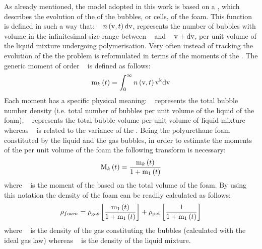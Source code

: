 \newcommand{ \YingYang}{ \ensuremath{\NumberDensityFunction{\BubbleVolume,\Time} \mathrm{d} \BubbleVolume}}
\newcommand{ \SangYang}{ \ensuremath{ \BubbleVolume + \mathrm{d} \BubbleVolume}}
As already mentioned, the model adopted in this work is based on a {\PopulationBalanceEquation}, which describes the evolution of the {\BubbleSizeDistribution} of the bubbles, or cells, of the foam. This function is defined in such a way that: {~\YingYang}, represents the number of bubbles with volume in the infinitesimal size range between {~\BubbleVolume} and {~\SangYang}, per unit volume of the liquid mixture undergoing polymerisation. 
Very often instead of tracking the evolution of the {\BubbleSizeDistribution} the problem is reformulated in terms of the moments of the {\BubbleSizeDistribution}. 
The generic moment of order {~\GenericOrder} is defined as follows:
\begin{equation}
    {\ensuremath{\mathrm{m}_{k}}}\left( t \right) = 
    \int_{0}^{\infty} n\left({\mathrm{v},t}\right) \mathrm{v}^{\mathrm{k}}\mathrm{d}\mathrm{v}
\end{equation}
Each moment has a specific physical meaning: {~\MomentOfOrderZero} represents the total bubble number density (i.e. total number of bubbles per unit volume of the liquid of the foam), {~\MomentOfOrderOne} represents the total bubble volume per unit volume of liquid mixture whereas {~\MomentOfOrderTwo} is related to the variance of the {\BubbleSizeDistribution}. 
Being the polyurethane foam constituted by the liquid and the gas bubbles, in order to estimate the moments of the {\BubbleSizeDistribution} per unit volume of the foam the following transform is necessary:
\begin{equation}
       {\ensuremath{\mathrm{M}_{k}}}\left( t \right) = 
       \frac{{\mathrm{m}_{k}}\left( t \right) }{ 1 + {\mathrm{m}_{1}}\left( t \right) } 
\end{equation}
where {~\VolumeMomentOfOrderGeneric} is the moment of the {\BubbleSizeDistribution} based on the total volume of the foam. 
By using this notation the density of the foam can be readily calculated as follows:
\begin{equation}
    \rho_{foam} = 
    \rho_{\mathrm{gas}}
    \left[
        \frac{{\mathrm{m}_{1}}\left( t \right) }{ 1 + {\mathrm{m}_{1}}\left( t \right) } 
    \right] +
    \rho_{\mathrm{pet}}
    \left[
        \frac{ 1 }{ 1 + {\mathrm{m}_{1}}\left( t \right) } 
    \right]
\end{equation}
where {~\Density{\GasPhase}} is the density of the gas constituting the bubbles (calculated with the ideal gas law) whereas  {~\DensityPolyurethane} is the density of the liquid mixture. 
